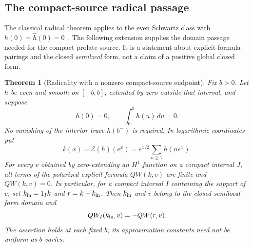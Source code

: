 \documentclass[11pt]{article}
\newtheorem{theorem}{Theorem}[section]
\theoremstyle{remark}
\begin{document}
\subsection{The compact-source radical passage}
The classical radical theorem applies to the even Schwartz class with
$h(0)=\widehat h(0)=0$~\cite[Section 3]{ConnesConsani2023}.
The following extension supplies the domain passage needed for the compact
prolate source. It is a statement about explicit-formula pairings and the
closed \emph{semilocal} form, not a claim of a positive global closed form.

\begin{theorem}[Radicality with a nonzero compact-source endpoint]
\label{thm:v14-radical}
Fix $b>0$. Let $h$ be even and smooth on $[-b,b]$, extended by zero
outside that interval, and suppose
\[
 h(0)=0,\qquad \int_0^b h(u)\,du=0.
\]
No vanishing of the interior trace $h(b^-)$ is required. In logarithmic
coordinates put
\[
 k(x)=\mathcal E(h)(e^x)=e^{x/2}\sum_{n\ge1}h(ne^x).
\]
For every $v$ obtained by zero-extending an $H^1$ function on a compact
interval $J$, all terms of the polarized explicit formula $QW(k,v)$ are
finite and $QW(k,v)=0$. In particular, for a compact interval $I$
containing the support of $v$, set $k_{\rm in}=1_I k$ and
$r=k-k_{\rm in}$. Then $k_{\rm in}$ and $v$ belong to the closed
semilocal form domain and
\[
 QW_I(k_{\rm in},v)=-QW(r,v).
\]
The assertion holds at each fixed $b$; its approximation constants need
not be uniform as $b$ varies.
\end{theorem}
\end{document}
